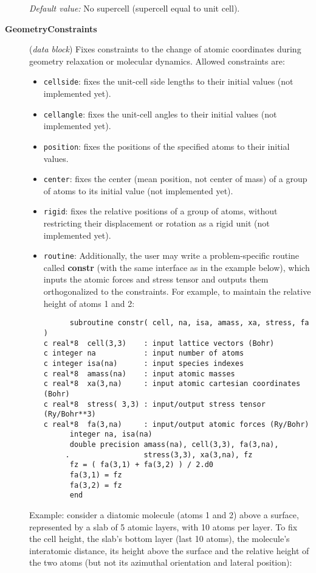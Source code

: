 \begin{description}
{\it Default value:} No supercell (supercell equal to unit cell).


\item[{\bf GeometryConstraints}] ({\it data block}) 
Fixes constraints to the change of atomic coordinates during
geometry relaxation or molecular dynamics. Allowed constraints are:
\begin{itemize}
\item {\tt cellside}: fixes the unit-cell side lengths to
their initial values (not implemented yet).
\item {\tt cellangle}: fixes the unit-cell angles to
their initial values (not implemented yet).
\item {\tt position}: fixes the positions of the specified atoms to
their initial values.
\item {\tt center}: fixes the center (mean position, not center of
mass) of a group of atoms to its initial value (not implemented yet).
\item {\tt rigid}: fixes the relative positions of a group of atoms,
without restricting their displacement or rotation as a rigid unit
(not implemented yet).
\item {\tt routine}: Additionally, the user may write a 
problem-specific routine called {\bf constr} (with the same 
interface as in the example below), which inputs the atomic
forces and stress tensor and outputs them orthogonalized to the
constraints. For example, to maintain the relative height of 
atoms 1 and 2:

\begin{verbatim}
      subroutine constr( cell, na, isa, amass, xa, stress, fa )
c real*8  cell(3,3)    : input lattice vectors (Bohr)
c integer na           : input number of atoms
c integer isa(na)      : input species indexes
c real*8  amass(na)    : input atomic masses
c real*8  xa(3,na)     : input atomic cartesian coordinates (Bohr)
c real*8  stress( 3,3) : input/output stress tensor (Ry/Bohr**3)
c real*8  fa(3,na)     : input/output atomic forces (Ry/Bohr)
      integer na, isa(na)
      double precision amass(na), cell(3,3), fa(3,na),
     .                 stress(3,3), xa(3,na), fz
      fz = ( fa(3,1) + fa(3,2) ) / 2.d0
      fa(3,1) = fz
      fa(3,2) = fz
      end
\end{verbatim}

\end{itemize}

Example: consider a diatomic molecule (atoms 1 and 2) above a surface, 
represented by a slab of 5 atomic layers, with 10 atoms per layer.
To fix the cell height, the slab's bottom layer (last 10 atoms),
the molecule's interatomic distance, its height above the surface and
the relative height of the two atoms
(but not its azimuthal orientation and lateral position):


\end{description}
